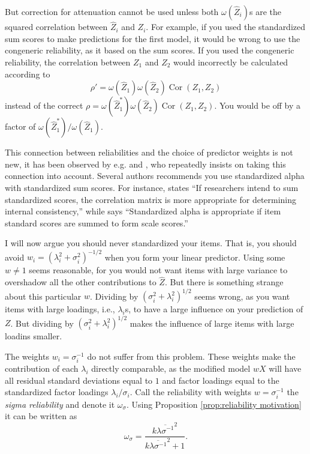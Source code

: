\documentclass[twoside]{article}
\DeclareMathOperator{\Cor}{Cor}
\begin{document}
But correction for attenuation cannot be used unless both $\omega(\hat{Z}_i)$s are the squared correlation between $\hat{Z}_i$ and $Z_i$. For example, if you used the standardized sum scores to make predictions for the first model, it would be wrong to use the congeneric reliability, as it based on the sum scores. If you used the congeneric reliability, the correlation between $Z_1$ and $Z_2$ would incorrectly be calculated according to $$\rho'=\omega(\hat{Z}_{1})\omega(\hat{Z}_{2})\Cor(Z_{1},Z_{2})$$
instead of the correct $\rho=\omega(\hat{Z}_{1}^{*})\omega(\hat{Z}_{2})\Cor(Z_{1},Z_{2})$.
You would be off by a factor of $\omega(\hat{Z}_{1}^{*})/\omega(\hat{Z}_{1})$.

This connection between reliabilities and the choice of predictor
weights is not new, it has been observed by e.g. \citet[][p. 112]{Joreskog1971-nn} and \citet{McNeish2018-vu}, who repeatedly insists on taking this connection into account. Several authors recommends you use standardized alpha with standardized sum scores. For instance, \citet[][p. 451]{Falk2011-ae} states \enquote{If researchers intend to sum
standardized scores, the correlation matrix is more appropriate for determining internal consistency,} while \citet[][p. 99]{Cortina1993-aq} says \enquote{Standardized alpha is appropriate if item standard scores are summed to form scale scores.}

I will now argue you should never standardized your items. That is, you should avoid $w_{i}=(\lambda_{i}^{2}+\sigma_{i}^{2})^{-1/2}$ when you form your linear predictor.
Using some $w\ne1$ seems reasonable, for you would not want items
with large variance to overshadow all the other contributions to $\hat{Z}$.
But there is something strange about this particular $w$. Dividing by $(\sigma_{i}^{2}+\lambda_{i}^{2})^{1/2}$
seems wrong, as you want items with large loadings, i.e., $\lambda_{i}$s, to have a large
influence on your prediction of $Z$. But dividing by $(\sigma_{i}^{2}+\lambda_{i}^{2})^{1/2}$
makes the influence of large items with large loadins smaller. 

The weights $w_i=\sigma_{i}^{-1}$ do not suffer from this problem. These weights make the contribution of each $\lambda_i$ directly comparable, as the modified model $wX$ will have all residual standard deviations equal to $1$ and factor loadings equal to the standardized factor loadings $\lambda_i/\sigma_i$. Call the reliability with weights $w=\sigma_{i}^{-1}$ the \emph{sigma reliability} and denote it $\omega_\sigma$. Using Proposition \ref{prop:reliability motivation} it can be written as
\begin{equation}
\omega_\sigma=\frac{k\overline{\lambda\sigma^{-1}}^{2}}{k\overline{\lambda\sigma^{-1}}^{2}+1}.\label{eq:Sigma-standardized reliability}
\end{equation}
\end{document}
